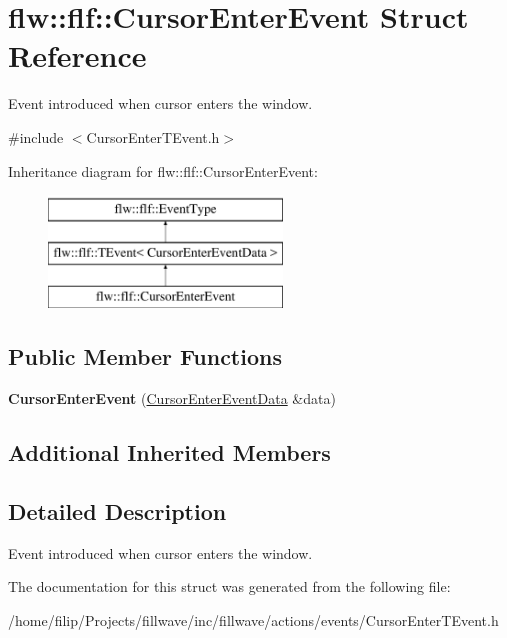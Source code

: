 \hypertarget{classflw_1_1flf_1_1CursorEnterEvent}{}\section{flw\+:\+:flf\+:\+:Cursor\+Enter\+Event Struct Reference}
\label{classflw_1_1flf_1_1CursorEnterEvent}


Event introduced when cursor enters the window.  




{\ttfamily \#include $<$Cursor\+Enter\+T\+Event.\+h$>$}

Inheritance diagram for flw\+:\+:flf\+:\+:Cursor\+Enter\+Event\+:\begin{figure}[H]
\begin{center}
\leavevmode
\includegraphics[height=3.000000cm]{classflw_1_1flf_1_1CursorEnterEvent}
\end{center}
\end{figure}
\subsection*{Public Member Functions}
\begin{DoxyCompactItemize}
\item 
{\bfseries Cursor\+Enter\+Event} (\hyperlink{structflw_1_1flf_1_1CursorEnterEventData}{Cursor\+Enter\+Event\+Data} \&data)\hypertarget{classflw_1_1flf_1_1CursorEnterEvent_a6c712068a4f6182771d55de3c3de2e3d}{}\label{classflw_1_1flf_1_1CursorEnterEvent_a6c712068a4f6182771d55de3c3de2e3d}

\end{DoxyCompactItemize}
\subsection*{Additional Inherited Members}


\subsection{Detailed Description}
Event introduced when cursor enters the window. 

The documentation for this struct was generated from the following file\+:\begin{DoxyCompactItemize}
\item 
/home/filip/\+Projects/fillwave/inc/fillwave/actions/events/Cursor\+Enter\+T\+Event.\+h\end{DoxyCompactItemize}
